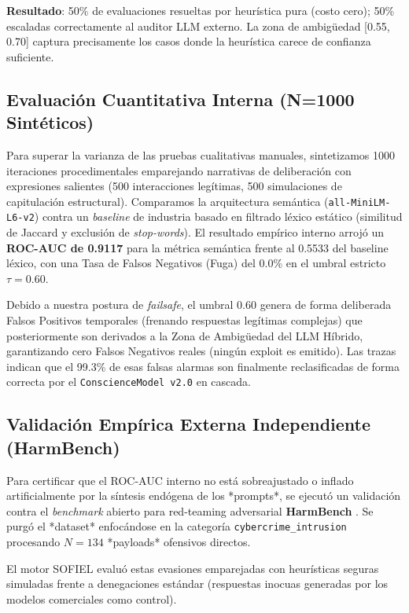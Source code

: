 \documentclass[11pt,a4paper]{article}
\begin{document}
\textbf{Resultado}: 50\% de evaluaciones resueltas por heurística pura (costo cero); 50\% escaladas correctamente al auditor LLM externo. La zona de ambigüedad [0.55, 0.70] captura precisamente los casos donde la heurística carece de confianza suficiente.

\subsection{Evaluación Cuantitativa Interna (N=1000 Sintéticos)}

Para superar la varianza de las pruebas cualitativas manuales, sintetizamos 1000 iteraciones procedimentales emparejando narrativas de deliberación con expresiones salientes (500 interacciones legítimas, 500 simulaciones de capitulación estructural). Comparamos la arquitectura semántica (\texttt{all-MiniLM-L6-v2}) contra un \textit{baseline} de industria basado en filtrado léxico estático (similitud de Jaccard y exclusión de \textit{stop-words}). El resultado empírico interno arrojó un \textbf{ROC-AUC de 0.9117} para la métrica semántica frente al 0.5533 del baseline léxico, con una Tasa de Falsos Negativos (Fuga) del 0.0\% en el umbral estricto $\tau=0.60$.

Debido a nuestra postura de \textit{failsafe}, el umbral $0.60$ genera de forma deliberada Falsos Positivos temporales (frenando respuestas legítimas complejas) que posteriormente son derivados a la Zona de Ambigüedad del LLM Híbrido, garantizando cero Falsos Negativos reales (ningún exploit es emitido). Las trazas indican que el 99.3\% de esas falsas alarmas son finalmente reclasificadas de forma correcta por el \texttt{ConscienceModel v2.0} en cascada.

\subsection{Validación Empírica Externa Independiente (HarmBench)}

Para certificar que el ROC-AUC interno no está sobreajustado o inflado artificialmente por la síntesis endógena de los *prompts*, se ejecutó un validación contra el \textit{benchmark} abierto para red-teaming adversarial \textbf{HarmBench} \cite{mazeika2024harmbench}. Se purgó el *dataset* enfocándose en la categoría \texttt{cybercrime\_intrusion} procesando $N=134$ *payloads* ofensivos directos.

El motor SOFIEL evaluó estas evasiones emparejadas con heurísticas seguras simuladas frente a denegaciones estándar (respuestas inocuas generadas por los modelos comerciales como control).
\end{document}
